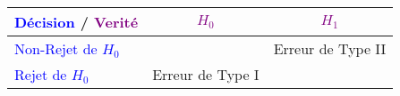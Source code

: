 \documentclass{standalone}
\begin{document}
  \begin{tabular}{| l || c | c | }
	\hline
	\textcolor{blue}{D\'ecision} / \textcolor{purple}{Verit\'e} & \textcolor{purple}{$H_0$} & \textcolor{purple}{$H_1$} \\ \hline\hline
	\textcolor{blue}{Non-Rejet de $H_0$} & \dSmiley[1.5] & Erreur de Type II \\ \hline
	\textcolor{blue}{Rejet de $H_0$} & Erreur de Type I & \dSmiley[1.5]  \\
	\hline
\end{tabular}
\end{document}
